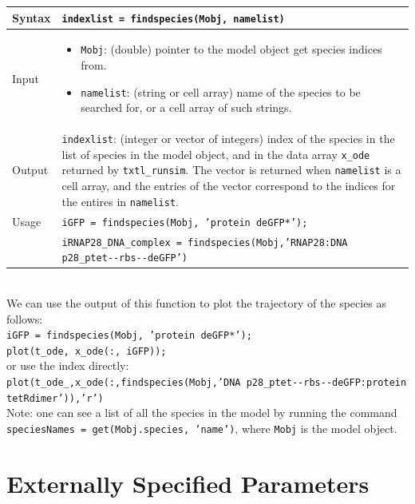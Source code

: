\documentclass[english]{report}
\begin{document}
			\begin{tabular}{p{2cm}|p{13cm}}
			Syntax & \texttt{indexlist = findspecies(Mobj, namelist)}\\ \hline
			Input &  \begin{itemize}
				\item \texttt{Mobj}: (double) pointer to the model object get species indices from.
				\item \texttt{namelist}: (string or cell array) name of the species to be searched for, or a cell array of such strings.
				\end{itemize} \\ \hline
			Output & \texttt{indexlist}: (integer or vector of integers) index of the species in the list of species in the model object, and in the data array \texttt{x\_ode} returned by \texttt{txtl\_runsim}. The vector is returned when \texttt{namelist} is a cell array, and the entries of the vector correspond to the indices for the entires in \texttt{namelist}. \\ \hline
			Usage & \texttt{iGFP = findspecies(Mobj, 'protein deGFP*');}\\
			& \texttt{iRNAP28\_DNA\_complex = findspecies(Mobj,'RNAP28:DNA p28\_ptet-{}-rbs-{}-deGFP')}
			\end{tabular} \\
			
			We can use the output of this function to plot the trajectory of the species as follows: \\
		\texttt{iGFP = findspecies(Mobj, 'protein deGFP*');}\\
  		\texttt{plot(t\_ode, x\_ode(:, iGFP));}	\\
  		  		
		or use the index directly: \\	
		\texttt{plot(t\_ode\_,x\_ode(:,findspecies(Mobj,'DNA p28\_ptet-{}-rbs-{}-deGFP:protein tetRdimer')),'r')} \\
		
		Note: one can see a list of all the species in the model by running the command \texttt{speciesNames = get(Mobj.species, 'name')}, where \texttt{Mobj} is the model object. 
					
	\section{Externally Specified Parameters}
\end{document}
